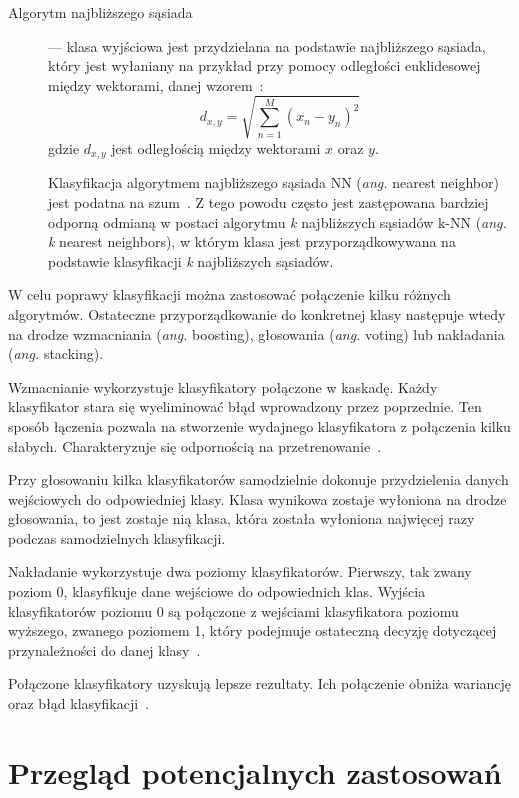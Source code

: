 \documentclass[skorowidz,skroty]{dyplomWEZUT}
\begin{document}
\begin{description}
    \item [Algorytm najbliższego sąsiada] --- klasa wyjściowa jest przydzielana na podstawie najbliższego sąsiada, który jest wyłaniany na przykład przy pomocy odległości euklidesowej między wektorami, danej wzorem~\cite{bci_introduction}: 
    $$d_{x,y} = \sqrt{\sum_{n=1}^{M}(x_n-y_n)^2}$$
    gdzie $d_{x,y}$ jest odległością między wektorami $x$ oraz $y$.

    Klasyfikacja algorytmem najbliższego sąsiada NN (\textit{ang.} nearest neighbor) jest podatna na szum~\cite{bci_introduction}. Z tego powodu często jest zastępowana bardziej odporną odmianą w postaci algorytmu \textit{k} najbliższych sąsiadów k-NN (\textit{ang.} \textit{k} nearest neighbors), w którym klasa jest przyporządkowywana na podstawie klasyfikacji \textit{k} najbliższych sąsiadów.
\end{description}

W celu poprawy klasyfikacji można zastosować połączenie kilku różnych algorytmów. Ostateczne przyporządkowanie do konkretnej klasy następuje wtedy na drodze wzmacniania (\textit{ang.} boosting), głosowania (\textit{ang.} voting) lub nakładania (\textit{ang.} stacking).

Wzmacnianie wykorzystuje klasyfikatory połączone w kaskadę. Każdy klasyfikator stara się wyeliminować błąd wprowadzony przez poprzednie. Ten sposób łączenia pozwala na stworzenie wydajnego klasyfikatora z połączenia kilku słabych. Charakteryzuje się odpornością na przetrenowanie~\cite{bci_trends}.

Przy głosowaniu kilka klasyfikatorów samodzielnie dokonuje przydzielenia danych wejściowych do odpowiedniej klasy. Klasa wynikowa zostaje wyłoniona na drodze głosowania, to jest zostaje nią klasa, która została wyłoniona najwięcej razy podczas samodzielnych klasyfikacji.

Nakładanie wykorzystuje dwa poziomy klasyfikatorów. Pierwszy, tak zwany poziom 0, klasyfikuje dane wejściowe do odpowiednich klas. Wyjścia klasyfikatorów poziomu 0 są połączone z wejściami klasyfikatora poziomu wyższego, zwanego poziomem 1, który podejmuje ostateczną decyzję dotyczącej przynależności do danej klasy~\cite{eeg_classification}.

Połączone klasyfikatory uzyskują lepsze rezultaty. Ich połączenie obniża wariancję oraz błąd klasyfikacji~\cite{eeg_classification}.


\section{Przegląd potencjalnych zastosowań}
\end{document}
